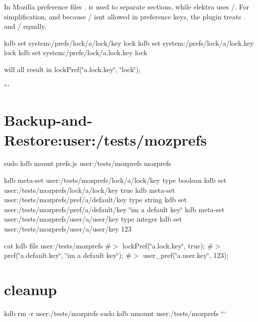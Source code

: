 In Mozilla preference files {\ttfamily .} is used to separate sections, while elektra uses {\ttfamily /}. For simplification, and because {\ttfamily /} isn\textquotesingle{}t allowed in preference keys, the plugin treats {\ttfamily .} and {\ttfamily /} equally.


\begin{DoxyCode}
kdb set system:/prefs/lock/a/lock/key lock
kdb set system:/prefs/lock/a/lock.key lock
kdb set system:/prefs/lock/a.lock.key lock
\end{DoxyCode}


will all result in {\ttfamily lock\+Pref(\char`\"{}a.\+lock.\+key\char`\"{}, \char`\"{}lock\char`\"{});}

``` \hypertarget{autotoc_md441_autotoc_md446}{}\section{Backup-\/and-\/\+Restore\+:user\+:/tests/mozprefs}\label{autotoc_md441_autotoc_md446}
sudo kdb mount prefs.\+js user\+:/tests/mozprefs mozprefs

kdb meta-\/set user\+:/tests/mozprefs/lock/a/lock/key type boolean kdb set user\+:/tests/mozprefs/lock/a/lock/key true kdb meta-\/set user\+:/tests/mozprefs/pref/a/default/key type string kdb set user\+:/tests/mozprefs/pref/a/default/key \char`\"{}i\textquotesingle{}m a default key\char`\"{} kdb meta-\/set user\+:/tests/mozprefs/user/a/user/key type integer kdb set user\+:/tests/mozprefs/user/a/user/key 123

cat {\ttfamily kdb file user\+:/tests/mozprefs} \#$>$ lock\+Pref(\char`\"{}a.\+lock.\+key\char`\"{}, true); \#$>$ pref(\char`\"{}a.\+default.\+key\char`\"{}, \char`\"{}i\textquotesingle{}m a default key\char`\"{}); \#$>$ user\+\_\+pref(\char`\"{}a.\+user.\+key\char`\"{}, 123);\hypertarget{autotoc_md441_autotoc_md447}{}\section{cleanup}\label{autotoc_md441_autotoc_md447}
kdb rm -\/r user\+:/tests/mozprefs sudo kdb umount user\+:/tests/mozprefs ``` 